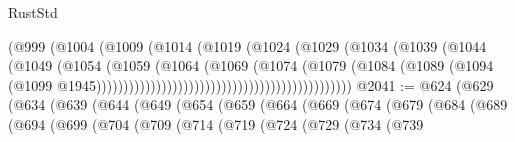 \begin{lexlean}{RustStd}
\begin{coremodule}
{\begin{coremodule}
{{{{{{{{{{{{{{{{{{{{{{{{{{                                                        (@999
                                                          (@1004
                                                            (@1009
                                                              (@1014
                                                                (@1019
                                                                  (@1024
                                                                    (@1029
                                                                      (@1034
                                                                        (@1039
                                                                          (@1044
                                                                            (@1049
                                                                              (@1054
                                                                                (@1059
                                                                                  (@1064
                                                                                    (@1069
                                                                                      (@1074
                                                                                        (@1079
                                                                                          (@1084
                                                                                            (@1089
                                                                                              (@1094
                                                                                                (@1099
                                                                                                  @1945)))))))))))))))))))))))))))))))))))))))))))))))
@2041 := @624
    (@629
      (@634
        (@639
          (@644
            (@649
              (@654
                (@659
                  (@664
                    (@669
                      (@674
                        (@679
                          (@684
                            (@689
                              (@694
                                (@699
                                  (@704
                                    (@709
                                      (@714
                                        (@719
                                          (@724
                                            (@729
                                              (@734
                                                (@739
}}}}}}}}}}}}}}}}}}}}}}}}}}
\end{coremodule}}
\end{coremodule}
\end{lexlean}

